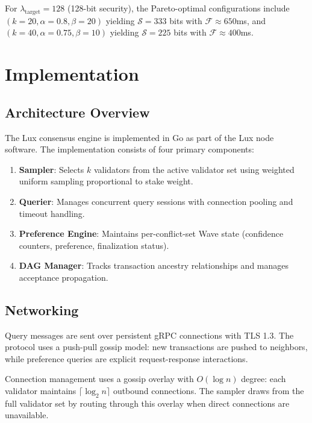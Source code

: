\documentclass[11pt,a4paper]{article}
\begin{document}
For $\lambda_{\text{target}} = 128$ (128-bit security), the Pareto-optimal configurations
include $(k=20, \alpha=0.8, \beta=20)$ yielding $\mathcal{S} = 333$ bits with $\mathcal{F} \approx 650$ms, and
$(k=40, \alpha=0.75, \beta=10)$ yielding $\mathcal{S} = 225$ bits with $\mathcal{F} \approx 400$ms.

\section{Implementation}
\label{sec:implementation}

\subsection{Architecture Overview}

The Lux consensus engine is implemented in Go as part of the Lux node software. The
implementation consists of four primary components:

\begin{enumerate}
\item \textbf{Sampler}: Selects $k$ validators from the active validator set using
weighted uniform sampling proportional to stake weight.
\item \textbf{Querier}: Manages concurrent query sessions with connection pooling and
timeout handling.
\item \textbf{Preference Engine}: Maintains per-conflict-set Wave state (confidence
counters, preference, finalization status).
\item \textbf{DAG Manager}: Tracks transaction ancestry relationships and manages
acceptance propagation.
\end{enumerate}

\subsection{Networking}

Query messages are sent over persistent gRPC connections with TLS 1.3. The protocol uses
a push-pull gossip model: new transactions are pushed to neighbors, while preference
queries are explicit request-response interactions.

Connection management uses a gossip overlay with $O(\log n)$ degree: each validator
maintains $\lceil \log_2 n \rceil$ outbound connections. The sampler draws from the full
validator set by routing through this overlay when direct connections are unavailable.
\end{document}
